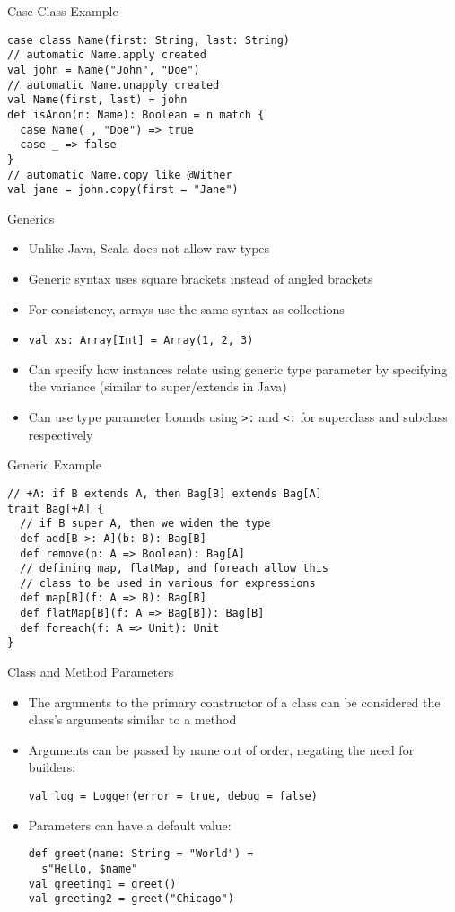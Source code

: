 \documentclass{beamer}
\begin{document}
\begin{frame}[fragile]{Case Class Example}
\begin{lstlisting}
case class Name(first: String, last: String)
// automatic Name.apply created
val john = Name("John", "Doe")
// automatic Name.unapply created
val Name(first, last) = john
def isAnon(n: Name): Boolean = n match {
  case Name(_, "Doe") => true
  case _ => false
}
// automatic Name.copy like @Wither
val jane = john.copy(first = "Jane")
\end{lstlisting}
\end{frame}

\begin{frame}{Generics}
\begin{itemize}
\item Unlike Java, Scala does not allow raw types
\item Generic syntax uses square brackets instead of angled brackets
\item For consistency, arrays use the same syntax as collections
\item \lstinline{val xs: Array[Int] = Array(1, 2, 3)}
\item Can specify how instances relate using generic type parameter by
specifying the variance (similar to super/extends in Java)
\item Can use type parameter bounds using \lstinline{>:} and \lstinline{<:}
for superclass and subclass respectively
\end{itemize}
\end{frame}

\begin{frame}[fragile]{Generic Example}
\begin{lstlisting}
// +A: if B extends A, then Bag[B] extends Bag[A]
trait Bag[+A] {
  // if B super A, then we widen the type
  def add[B >: A](b: B): Bag[B]
  def remove(p: A => Boolean): Bag[A]
  // defining map, flatMap, and foreach allow this
  // class to be used in various for expressions
  def map[B](f: A => B): Bag[B]
  def flatMap[B](f: A => Bag[B]): Bag[B]
  def foreach(f: A => Unit): Unit
}
\end{lstlisting}
\end{frame}

\begin{frame}[fragile]{Class and Method Parameters}
\begin{itemize}
\item The arguments to the primary constructor of a class can be considered the
class's arguments similar to a method
\item Arguments can be passed by name out of order, negating the need for builders:
\begin{lstlisting}
val log = Logger(error = true, debug = false)
\end{lstlisting}
\item Parameters can have a default value:
\begin{lstlisting}
def greet(name: String = "World") =
  s"Hello, $name"
val greeting1 = greet()
val greeting2 = greet("Chicago")
\end{lstlisting}
\end{itemize}
\end{frame}
\end{document}
